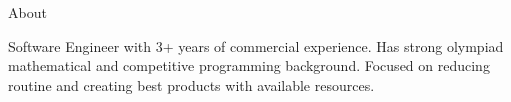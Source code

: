 \begin{cvsection}{About}

    Software Engineer with 3+ years of commercial experience.
    Has strong olympiad mathematical and competitive programming background.
    Focused on reducing routine and creating best products with available resources.

\end{cvsection}
